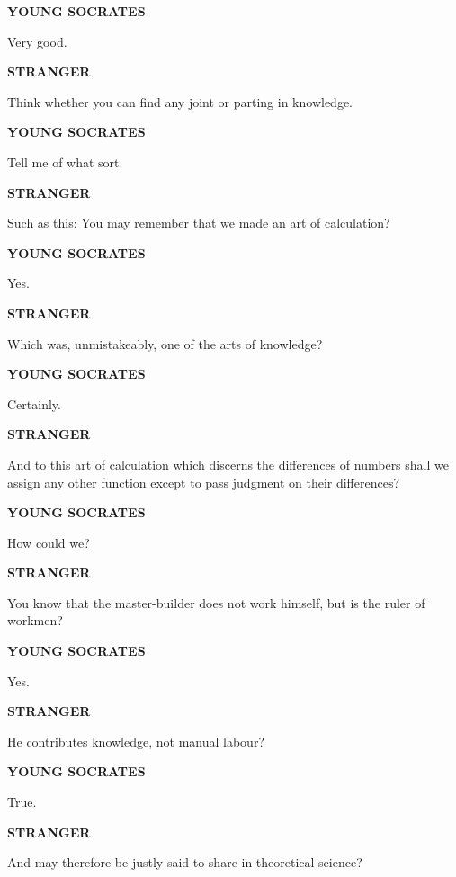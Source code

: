 \documentclass[11pt,letter]{article}
\begin{document}
\par \textbf{YOUNG SOCRATES}
\par   Very good.

\par \textbf{STRANGER}
\par   Think whether you can find any joint or parting in knowledge.

\par \textbf{YOUNG SOCRATES}
\par   Tell me of what sort.

\par \textbf{STRANGER}
\par   Such as this:  You may remember that we made an art of calculation?

\par \textbf{YOUNG SOCRATES}
\par   Yes.

\par \textbf{STRANGER}
\par   Which was, unmistakeably, one of the arts of knowledge?

\par \textbf{YOUNG SOCRATES}
\par   Certainly.

\par \textbf{STRANGER}
\par   And to this art of calculation which discerns the differences of numbers shall we assign any other function except to pass judgment on their differences?

\par \textbf{YOUNG SOCRATES}
\par   How could we?

\par \textbf{STRANGER}
\par   You know that the master-builder does not work himself, but is the ruler of workmen?

\par \textbf{YOUNG SOCRATES}
\par   Yes.

\par \textbf{STRANGER}
\par   He contributes knowledge, not manual labour?

\par \textbf{YOUNG SOCRATES}
\par   True.

\par \textbf{STRANGER}
\par   And may therefore be justly said to share in theoretical science?
\end{document}
